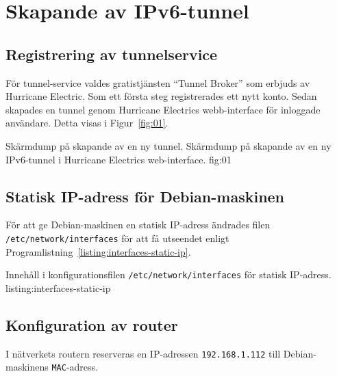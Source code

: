 %
%
%


\section{Skapande av IPv6-tunnel}
\subsection{Registrering av tunnelservice}
För tunnel-service valdes gratistjänsten ``Tunnel Broker''
\cite{ipv6:tunnelbroker} som erbjuds av Hurricane Electric.  
Som ett första steg registrerades ett nytt konto. Sedan skapades en tunnel
genom Hurricane Electrics webb-interface för inloggade användare. 
Detta visas i Figur~\ref{fig:01}.

           {Skärmdump på skapande av en ny tunnel.}
           {Skärmdump på skapande av en ny IPv6-tunnel i Hurricane Electrics
            web-interface.}
           {fig:01}


\subsection{Statisk IP-adress för Debian-maskinen}
För att ge Debian-maskinen en statisk IP-adress ändrades filen
\texttt{/etc/network/interfaces} för att få utseendet enligt
Programlistning~\ref{listing:interfaces-static-ip}.

            {Innehåll i konfigurationsfilen \texttt{/etc/network/interfaces}
 					   för statisk IP-adress.}
            {listing:interfaces-static-ip}


\subsection{Konfiguration av router}
I nätverkets routern reserveras en IP-adressen \texttt{192.168.1.112} till
Debian-maskinens \texttt{MAC}-adress.


